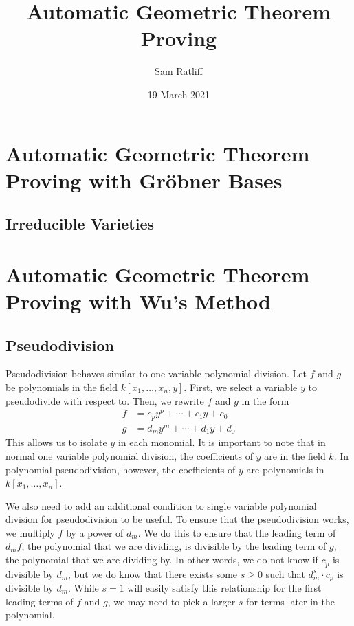 \documentclass{article}
\title{Automatic Geometric Theorem Proving}
\author{Sam Ratliff}
\date{19 March 2021}
\theoremstyle{plain}
\theoremstyle{definition}
\theoremstyle{remark}
\begin{document}
\maketitle



\section{Automatic Geometric Theorem Proving with Gröbner Bases}
\subsection{Irreducible Varieties}

\section{Automatic Geometric Theorem Proving with Wu's Method}
\subsection{Pseudodivision}
Pseudodivision behaves similar to one variable polynomial division. Let $f$ and $g$ be polynomials in the field $k[x_1,\dots,x_n,y]$.
First, we select a variable $y$ to pseudodivide with respect to. Then, we rewrite $f$ and $g$ in the form 
\begin {align*}
    f & = c_py^p + \cdots + c_1y + c_0\\
    g & = d_my^m + \cdots + d_1y + d_0
\end{align*}
This allows us to isolate $y$ in each monomial. It is important to note that in normal one variable polynomial division, the coefficients of $y$ are in the field $k$. 
In polynomial pseudodivision, however, the coefficients of $y$ are polynomials in $k[x_1,\dots,x_n]$.

We also need to add an additional condition to single variable polynomial division for pseudodivision to be useful. 
To ensure that the pseudodivision works, we multiply $f$ by a power of $d_m$. 
We do this to ensure that the leading term of $d_m f$, the polynomial that we are dividing, is divisible by the leading term of $g$, the polynomial that we are dividing by. 
In other words, we do not know if $c_p$ is divisible by $d_m$, but we do know that there exists some $s \geq 0$ such that $d_m^s\cdot c_p$ is divisible by $d_m$.
While $s = 1$ will easily satisfy this relationship for the first leading terms of $f$ and $g$, we may need to pick a larger $s$ for terms later in the polynomial.
\end{document}

